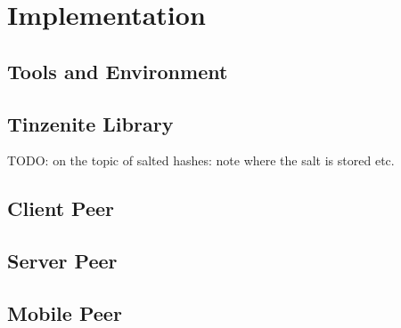 \chapter{Implementation}
\label{chap:implementation}


\section{Tools and Environment}

\section{Tinzenite Library}

TODO: on the topic of salted hashes: note where the salt is stored etc.

\section{Client Peer}

\section{Server Peer}

\section{Mobile Peer}
